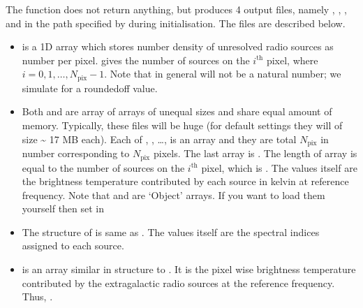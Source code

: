 \documentclass[letterpaper,10pt,english]{sphinxmanual}
\begin{document}
\sphinxAtStartPar
The function does not return anything, but produces 4 output files, namely , , , and  in the path specified by  during initialisation. The files are described below.
\begin{itemize}
\item {} 
\sphinxAtStartPar
{} is a 1D array which stores number density of unresolved radio sources as number per pixel.  gives the number of sources on the \(i^{\mathrm{th}}\) pixel, where \(i=0,1,\ldots,N_{\mathrm{pix}}-1\). Note that in general  will not be a natural number; we simulate for a rounded\sphinxhyphen{}off value.

\item {} 
\sphinxAtStartPar
Both  and  are array of arrays of unequal sizes and share equal amount of memory. Typically, these files will be huge (for default settings they will of size \textasciitilde{} 17 MB each). Each of , , …, is an array and they are total \(N_{\mathrm{pix}}\) in number corresponding to \(N_{\mathrm{pix}}\) pixels. The last array is . The length of array  is equal to the number of sources on the \(i^{\mathrm{th}}\) pixel, which is . The values itself are the brightness temperature contributed by each source in kelvin at reference frequency. Note that  and  are ‘Object’ arrays. If you want to load them yourself then set  in 

\item {} 
\sphinxAtStartPar
The structure of  is same as . The values itself are the spectral indices assigned to each source.

\item {} 
\sphinxAtStartPar
{} is an array similar in structure to . It is the pixel wise brightness temperature contributed by the extragalactic radio sources at the reference frequency. Thus, .

\end{itemize}
\end{document}
